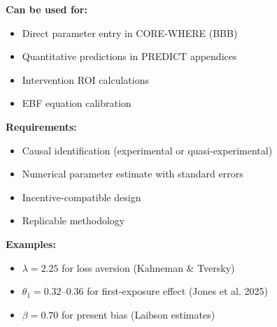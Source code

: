 \documentclass[11pt, a4paper]{article}
\begin{document}
\begin{tcolorbox}[colback=green!5!white, colframe=green!75!black,
    title=Tier 1: Causal-Calibrated (Gold Standard)]

\textbf{Can be used for:}
\begin{itemize}[nosep]
    \item Direct parameter entry in CORE-WHERE (BBB)
    \item Quantitative predictions in PREDICT appendices
    \item Intervention ROI calculations
    \item EBF equation calibration
\end{itemize}

\textbf{Requirements:}
\begin{itemize}[nosep]
    \item Causal identification (experimental or quasi-experimental)
    \item Numerical parameter estimate with standard errors
    \item Incentive-compatible design
    \item Replicable methodology
\end{itemize}

\textbf{Examples:}
\begin{itemize}[nosep]
    \item $\lambda = 2.25$ for loss aversion (Kahneman \& Tversky)
    \item $\theta_1 = 0.32\text{--}0.36$ for first-exposure effect (Jones et al. 2025)
    \item $\beta = 0.70$ for present bias (Laibson estimates)
\end{itemize}

\end{tcolorbox}
\end{document}

